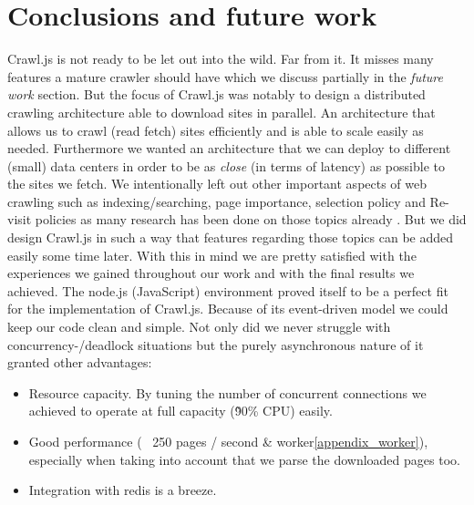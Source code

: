 
\chapter{Conclusions and future work} %
\label{Chapter6} %

Crawl.js is not ready to be let out into the wild. Far from it. It misses many features a mature crawler should have which we discuss partially in the \emph{future work} section. But the focus of Crawl.js was notably to design a distributed crawling architecture able to download sites in parallel. An architecture that allows us to crawl (read fetch) sites efficiently and is able to scale easily as needed. Furthermore we wanted an architecture that we can deploy to different (small) data centers in order to be as \emph{close} (in terms of latency) as possible to the sites we fetch. We intentionally left out other important aspects of web crawling such as indexing/searching, page importance, selection policy and Re-visit policies as many research has been done on those topics already \cite{page_importance1}\cite{page_importance2}\cite{wiki:web_crawler}. But we did design Crawl.js in such a way that features regarding those topics can be added easily some time later.
\newline
\newline
With this in mind we are pretty satisfied with the experiences we gained throughout our work and with the final results we achieved. The node.js (JavaScript) environment proved itself to be a perfect fit for the implementation of Crawl.js. Because of its event-driven model we could keep our code clean and simple. Not only did we never struggle with concurrency-/deadlock situations but the purely asynchronous nature of it granted other advantages:
\begin{itemize}
\item Resource capacity. By tuning the number of concurrent connections we achieved to operate at full capacity (\~ 90\% CPU) easily.
\item Good performance (~ 250 pages / second \& worker\ref{appendix_worker}), especially when taking into account that we parse the downloaded pages too.
\item Integration with redis is a breeze.
\end{itemize}

